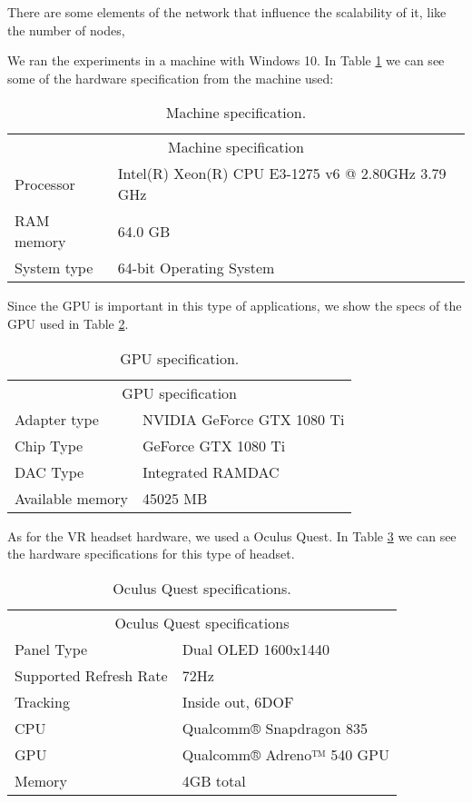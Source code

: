 There are some elements of the network that influence the scalability of it, like the number of nodes,

We ran the experiments in a machine with Windows 10. In Table \ref{tab:machine-specs} we can see some of the hardware specification from the machine used:
\begin{table}[h!]
\centering
\begin{tabular}{ll}
\multicolumn{2}{c}{Machine specification}                        \\
Processor   & Intel(R) Xeon(R) CPU E3-1275 v6 @ 2.80GHz 3.79 GHz \\
RAM memory  & 64.0 GB                                            \\
System type & 64-bit Operating System
\end{tabular}
\caption{Machine specification.}
\label{tab:machine-specs}
\end{table}

Since the GPU is important in this type of applications, we show the specs of the GPU used in Table \ref{tab:gpu-specs}.

\begin{table}[h!]
\centering
\begin{tabular}{ll}
\multicolumn{2}{c}{GPU specification} \\
Adapter type   & NVIDIA GeForce GTX 1080 Ti \\
Chip Type  &  GeForce GTX 1080 Ti \\
DAC Type & Integrated RAMDAC \\
Available memory & 45025 MB
\end{tabular}
\caption{GPU specification.}
\label{tab:gpu-specs}
\end{table}

As for the VR headset hardware, we used a Oculus Quest. In Table \ref{tab:oculus-specs} we can see the hardware specifications for this type of headset.

\begin{table}[h!]
\centering
\begin{tabular}{ll}
\multicolumn{2}{c}{Oculus Quest specifications} \\
Panel Type   & Dual OLED 1600x1440 \\
Supported Refresh Rate  &  72Hz \\
Tracking & Inside out, 6DOF \\
CPU & Qualcomm® Snapdragon 835 \\
GPU & Qualcomm® Adreno™ 540 GPU \\
Memory & 4GB total
\end{tabular}
\caption{Oculus Quest specifications.}
\label{tab:oculus-specs}
\end{table}

